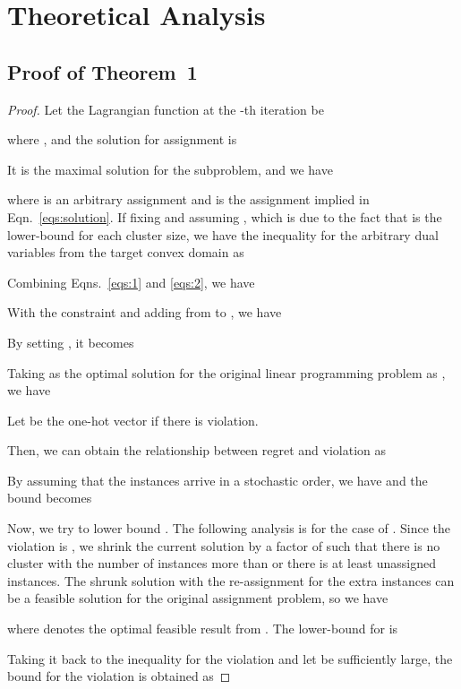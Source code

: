 \documentclass[10pt,twocolumn,letterpaper]{article}
\begin{document}
{\small


}

\appendix

\section{Theoretical Analysis}
\subsection{Proof of Theorem~1}
\begin{proof}
Let the Lagrangian function at the -th iteration be

where ,
and the solution for assignment is 

It is the maximal solution for the subproblem, and we have

where  is an arbitrary assignment and  is the assignment implied in Eqn.~\ref{eqs:solution}.
If fixing  and assuming , which is due to the fact that  is the lower-bound for each cluster size, we have the inequality for the arbitrary dual variables  from the target convex domain as

Combining Eqns.~\ref{eqs:1} and \ref{eqs:2}, we have

With the constraint  and adding  from  to , we have

By setting , it becomes

Taking  as the optimal solution for the original linear programming problem as , we have

Let  be the one-hot vector if there is violation.

Then, we can obtain the relationship between regret and violation as

By assuming that the instances arrive in a stochastic order, we have  and the bound becomes

Now, we try to lower bound . The following analysis is for the case of . Since the violation is , we shrink the current solution  by a factor of  such that there is no cluster with the number of instances more than  or there is at least  unassigned instances. The shrunk solution with the re-assignment for the extra instances can be a feasible solution for the original assignment problem, so we have

where  denotes the optimal feasible result from .
The lower-bound for  is

Taking it back to the inequality for the violation and let  be sufficiently large, the bound for the violation is obtained as

\end{proof}
\end{document}
